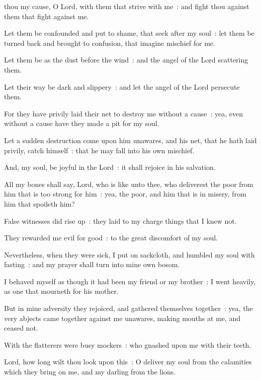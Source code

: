 thou my cause, O Lord, with them that strive with me~: and fight thou against them that fight against me.\par
{}
Let them be confounded and put to shame, that seek after my soul~: let them be turned back and brought to confusion, that imagine mischief for me.\par
{}Let them be as the dust before the wind~: and the angel of the Lord scattering them.\par
{}Let their way be dark and slippery~: and let the angel of the Lord persecute them.\par
{}For they have privily laid their net to destroy me without a cause~: yea, even without a cause have they made a pit for my soul.\par
{}Let a sudden destruction come upon him unawares, and his net, that he hath laid privily, catch himself~: that he may fall into his own mischief.\par
{}And, my soul, be joyful in the Lord~: it shall rejoice in his salvation.\par
{}All my bones shall say, Lord, who is like unto thee, who deliverest the poor from him that is too strong for him~: yea, the poor, and him that is in misery, from him that spoileth him?\par
{}False witnesses did rise up~: they laid to my charge things that I knew not.\par
{}They rewarded me evil for good~: to the great discomfort of my soul.\par
{}Nevertheless, when they were sick, I put on sackcloth, and humbled my soul with fasting~: and my prayer shall turn into mine own bosom.\par
{}I behaved myself as though it had been my friend or my brother~: I went heavily, as one that mourneth for his mother.\par
{}But in mine adversity they rejoiced, and gathered themselves together~: yea, the very abjects came together against me unawares, making mouths at me, and ceased not.\par
{}With the flatterers were busy mockers~: who gnashed upon me with their teeth.\par
{}Lord, how long wilt thou look upon this~: O deliver my soul from the calamities which they bring on me, and my darling from the lions.\par
